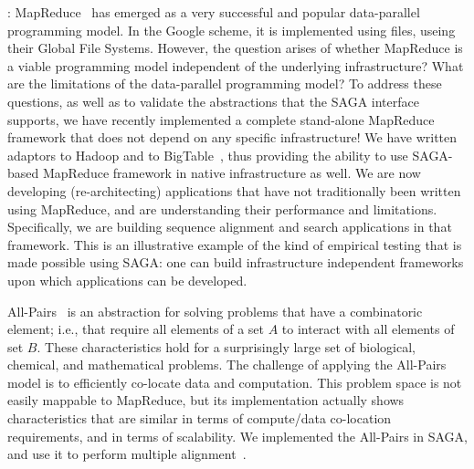 \documentclass[10pt,letterpaper]{article}
\begin{document}
: MapReduce~\cite{mapreduce} has emerged as a very
successful and popular data-parallel programming model. In the Google
scheme, it is implemented using files, useing their Global File
Systems. However, the question arises of whether MapReduce is a viable
programming model independent of the underlying infrastructure?  What
are the limitations of the data-parallel programming model? To address
these questions, as well as to validate the abstractions that
the SAGA interface supports, we have recently implemented a complete
stand-alone MapReduce framework that does not depend on any specific
infrastructure! We have written adaptors to Hadoop and to BigTable~\cite{hadoop,gbt},
thus providing the ability to use SAGA-based MapReduce framework in
native infrastructure as well.  We are now developing
(re-architecting) applications that have not traditionally been
written using MapReduce, and are understanding their performance and
limitations. Specifically, we are building sequence alignment and
search applications in that framework.  This is an
illustrative example of the kind of empirical testing that is made
possible using SAGA: one can build infrastructure independent
frameworks upon which applications can be developed.


 All-Pairs~\cite{all-pairs} is an abstraction for
solving problems that have a combinatoric element; i.e., that require
all elements of a set $A$ to interact with all elements of set $B$.
These characteristics hold for a surprisingly large set of
biological, chemical, and mathematical problems.  The challenge of
applying the All-Pairs model is to efficiently co-locate data and
computation.  This problem space is not easily mappable to MapReduce,
but its implementation actually shows characteristics that are similar
in terms of compute/data co-location requirements, and in terms of
scalability.  We implemented the All-Pairs in SAGA, and use it to
perform multiple alignment~\cite{escience_ahm08}.
\end{document}
